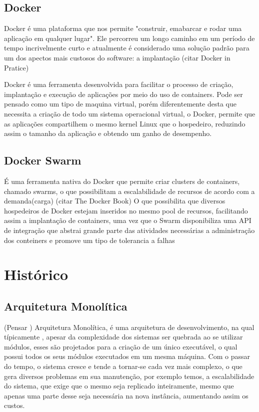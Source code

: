 \subsection{Docker}
Docker é uma plataforma que nos permite "construir, emabarcar e rodar uma aplicação em qualquer lugar". Ele percorreu um longo caminho em um período de tempo incrivelmente curto e atualmente é considerado uma solução padrão para um dos apectos mais custosos do software: a implantação (citar Docker in Pratice)

Docker é uma ferramenta desenvolvida para facilitar o processo de criação, implantação e execução de aplicações por meio do uso de containers.
Pode ser pensado como um tipo de maquina virtual, porém diferentemente desta que necessita a criação de todo um sistema operacional virtual, o Docker, permite que as aplicações compartilhem o mesmo kernel Linux que o hospedeiro, reduzindo assim o tamanho da aplicação e obtendo um ganho de desempenho.

\subsection{Docker Swarm}
É uma ferramenta nativa do Docker que permite criar clusters de containers, chamado swarms, o que possibilitam a escalabilidade de recursos de acordo com a demanda(carga) (citar The Docker Book)
O que possibilita que diversos hospedeiros de Docker estejam inseridos no mesmo pool de recursos, facilitando assim a implantação de containers, uma vez que o Swarm disponibiliza uma API de integração que abstrai grande parte das
atividades necessárias a administração dos conteiners e promove um tipo de tolerancia a falhas
\section{Histórico}

\subsection{Arquitetura Monolítica}
(Pensar ) Arquitetura Monolítica, é uma arquitetura de desenvolvimento, na qual típicamente , apesar da complexidade dos sistemas ser quebrada ao se utilizar módulos, esses são projetados para a criação de um único executável, o qual possui todos os seus módulos executados em um mesma máquina.
Com o passar do tempo, o sistema cresce e tende a tornar-se cada vez mais complexo, o que gera diversos problemas em sua manutenção, por exemplo temos, a escalabilidade do sistema, que exige que o mesmo seja replicado inteiramente, mesmo que apenas uma parte desse seja necessária na nova instância, aumentando assim os custos.

